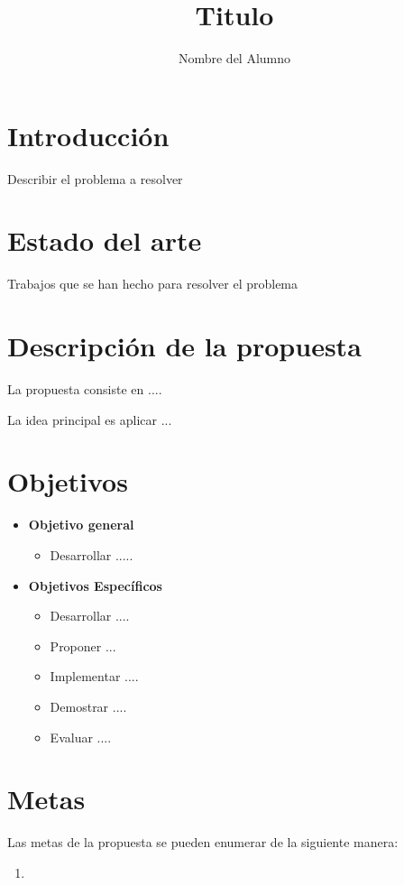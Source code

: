 \documentclass{article}
\begin{document}
\hyphenation{}

\title{Titulo}

\author{Nombre del Alumno}

\maketitle

\section{Introducción}\label{sec:introduccion}
Describir el problema a resolver\cite{ejemplo:2018}
\cite{cialdini1993influence}


\section{Estado del arte}\label{sec:estadoArte}
Trabajos que se han hecho para resolver el problema

\section{Descripción de la propuesta}\label{sec:descripcion}
La propuesta consiste en ....

La idea principal es aplicar ...

\section{Objetivos}\label{sec:objetivos}
\begin{itemize}
 \item \textbf{Objetivo general}
   \begin{itemize}
     \item Desarrollar .....
   \end{itemize}
 \item \textbf{Objetivos Específicos}
   \begin{itemize}
    \item Desarrollar ....
    \item Proponer ...
    \item Implementar ....
    \item Demostrar ....
    \item Evaluar ....
   \end{itemize}
\end{itemize}

\section{Metas}\label{sec:metas}
Las metas de la propuesta se pueden enumerar de la siguiente manera:
\begin{enumerate}
  \item 
\end{enumerate}
\end{document}
